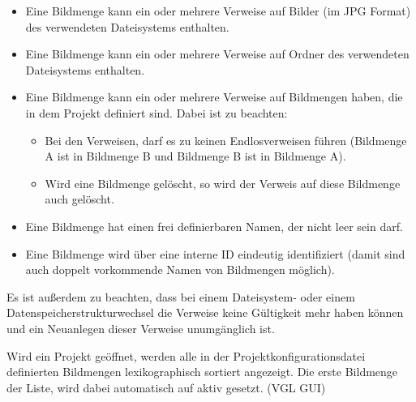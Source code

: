 	\begin{itemize}
		
		\item Eine Bildmenge kann ein oder mehrere Verweise auf Bilder (im JPG Format) des verwendeten Dateisystems enthalten.
		
		\item Eine Bildmenge kann ein oder mehrere Verweise auf Ordner des verwendeten Dateisystems enthalten.
		
		\item Eine Bildmenge kann ein oder mehrere Verweise auf Bildmengen haben, die in dem Projekt definiert sind. Dabei ist zu beachten:
		
			\begin{itemize}
			
				\item Bei den Verweisen, darf es zu keinen Endlosverweisen führen (Bildmenge A ist in Bildmenge B und Bildmenge B ist in Bildmenge A).
				
				\item Wird eine Bildmenge gelöscht, so wird der Verweis auf diese Bildmenge auch gelöscht.
			
			\end{itemize}
		
		\item Eine Bildmenge hat einen frei definierbaren Namen, der nicht leer sein darf.
		
		\item Eine Bildmenge wird über eine interne ID eindeutig identifiziert (damit sind auch doppelt vorkommende Namen von Bildmengen möglich).
	
	\end{itemize}
	
	Es ist außerdem zu beachten, dass bei einem Dateisystem- oder einem Datenspeicherstrukturwechsel die Verweise keine Gültigkeit mehr haben können und ein Neuanlegen dieser Verweise unumgänglich ist.\par Wird ein Projekt geöffnet, werden alle in der Projektkonfigurationsdatei definierten Bildmengen lexikographisch sortiert angezeigt. Die erste Bildmenge der Liste, wird dabei automatisch auf aktiv gesetzt. (VGL GUI)
	
